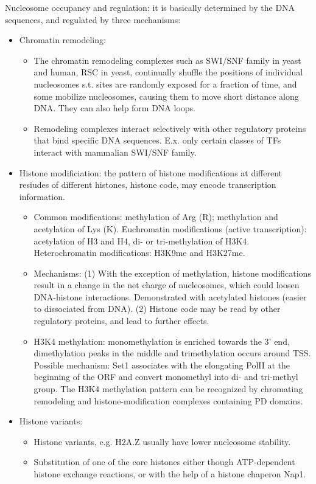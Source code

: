 \documentclass{report}
\begin{document}
Nucleosome occupancy and regulation: it is basically determined by the DNA sequences, and regulated by three mechanisms: 
\begin{itemize}
\item Chromatin remodeling: 
\begin{itemize}
	\item The chromatin remodeling complexes such as SWI/SNF family in yeast and human, RSC in yeast, continually shuffle the positions of individual nucleosomes s.t. sites are randomly exposed for a fraction of time, and some mobilize nucleosomes, causing them to move short distance along DNA. They can also help form DNA loops.  
	\item Remodeling complexes interact selectively with other regulatory proteins that bind specific DNA sequences. E.x. only certain classes of TFs interact with mammalian SWI/SNF family. 
\end{itemize}

\item Histone modificiation: the pattern of histone modifications at different resiudes of different histones, histone code, may encode transcription information. 
\begin{itemize}
	\item Common modifications: methylation of Arg (R); methylation and acetylation of Lys (K). Euchromatin modifications (active transcription): acetylation of H3 and H4, di- or tri-methylation of H3K4. Heterochromatin modifications: H3K9me and H3K27me. 
	\item Mechanisms: (1) With the exception of methylation, histone modifications result in a change in the net charge of nucleosomes, which could loosen DNA-histone interactions. Demonstrated with acetylated histones (easier to dissociated from DNA). (2) Histone code may be read by other regulatory proteins, and lead to further effects. 
	\item H3K4 methylation: monomethylation is enriched towards the 3' end, dimethylation peaks in the middle and trimethylation occurs around TSS. Possible mechanism: Set1 associates with the elongating PolII at the beginning of the ORF and convert monomethyl into di- and tri-methyl group. The H3K4 methylation pattern can be recognized by chromating remodeling and histone-modification complexes containing PD domains. 
\end{itemize}

\item Histone variants: 
\begin{itemize}
	\item Histone variants, e.g. H2A.Z usually have lower nucleosome stability.
	\item Substitution of one of the core histones either though ATP-dependent histone exchange reactions, or with the help of a histone chaperon Nap1. 
\end{itemize}
 
\end{itemize}
\end{document}
